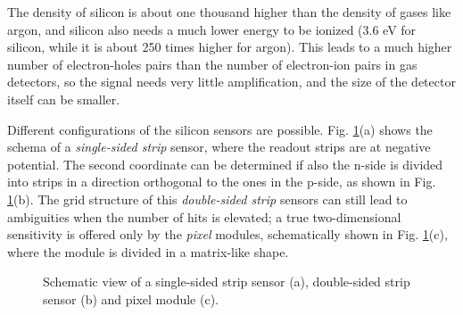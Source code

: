 The density of silicon is about one thousand higher than the density of gases like argon, and silicon also needs a much lower energy to be ionized (3.6 eV for silicon, while it is about 250 times higher for argon). This leads to a much higher number of electron-holes pairs than the number of electron-ion pairs in gas detectors, so the signal needs very little amplification, and the size of the detector itself can be smaller. 

Different configurations of the silicon sensors are possible. Fig. \ref{fig:det:silicon_schema}(a) shows the schema of a \textit{single-sided strip} sensor, where the readout strips are at negative potential. The second coordinate can be determined if also the n-side is divided into strips in a direction orthogonal to the ones in the p-side, as shown in Fig. \ref{fig:det:silicon_schema}(b). The grid structure of this \textit{double-sided strip} sensors can still lead to ambiguities when the number of hits is elevated; a true two-dimensional sensitivity is offered only by the \textit{pixel} modules, schematically shown in Fig. \ref{fig:det:silicon_schema}(c), where the module is divided in a matrix-like shape.

\begin{figure}[ht]
\centering
{}
\caption{Schematic view of a single-sided strip sensor (a), double-sided strip sensor (b) and pixel module (c). }
\label{fig:det:silicon_schema}
\end{figure}



